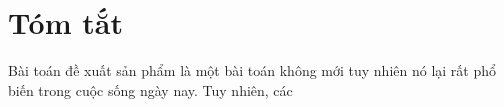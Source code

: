 \chapter*{Tóm tắt}
\label{summary}

Bài toán đề xuất sản phẩm là một bài toán không mới tuy nhiên nó lại rất phổ biến trong cuộc sống ngày nay. Tuy nhiên, các